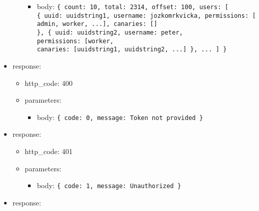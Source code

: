 \documentclass[
]{article}
\begin{document}
\begin{itemize}
\begin{itemize}
    \begin{itemize}
    \item
      body: \texttt{\{
      \textquotesingle{}count\textquotesingle{}:\ 10,\ 
      \textquotesingle{}total\textquotesingle{}:\ 2314,
      \textquotesingle{}offset\textquotesingle{}:\ 100,
      \textquotesingle{}users\textquotesingle{}:\ {[}
      	\{\ 
      		\textquotesingle{}uuid\textquotesingle{}:\ \textquotesingle{}uuidstring1\textquotesingle{},\ 
      		\textquotesingle{}username\textquotesingle{}:\ \textquotesingle{}jozkomrkvicka\textquotesingle{},\ 
      		\textquotesingle{}permissions\textquotesingle{}:\ {[}\textquotesingle{}admin\textquotesingle{},\ \textquotesingle{}worker\textquotesingle{},\ ...{]},
      		\textquotesingle{}canaries\textquotesingle{}:\ {[}{]}
      	\},\ 
      	\{\ 
      		\textquotesingle{}uuid\textquotesingle{}:\ \textquotesingle{}uuidstring2\textquotesingle{},\ 
      		\textquotesingle{}username\textquotesingle{}:\ \textquotesingle{}peter\textquotesingle{},
      		\textquotesingle{}permissions\textquotesingle{}:\ {[}\textquotesingle{}worker\textquotesingle{}{]},
      		\textquotesingle{}canaries\textquotesingle{}:\ {[}\textquotesingle{}uuidstring1\textquotesingle{},\ \textquotesingle{}uuidstring2\textquotesingle{},\ ...{]}
      	\},
      	...
      {]}
      \}}
    \end{itemize}
  \end{itemize}
\item
  response:

  \begin{itemize}
  \item
    http\_code: 400
  \item
    parameters:

    \begin{itemize}
    \item
      body: \texttt{\{
      \textquotesingle{}code\textquotesingle{}:\ 0,\ 
      \textquotesingle{}message\textquotesingle{}:\ \textquotesingle{}Token\ not\ provided\textquotesingle{}
      \}}
    \end{itemize}
  \end{itemize}
\item
  response:

  \begin{itemize}
  \item
    http\_code: 401
  \item
    parameters:

    \begin{itemize}
    \item
      body: \texttt{\{
      \textquotesingle{}code\textquotesingle{}:\ 1,\ 
      \textquotesingle{}message\textquotesingle{}:\ \textquotesingle{}Unauthorized\textquotesingle{}
      \}}
    \end{itemize}
  \end{itemize}
\item
  response:


\end{itemize}
\end{document}
